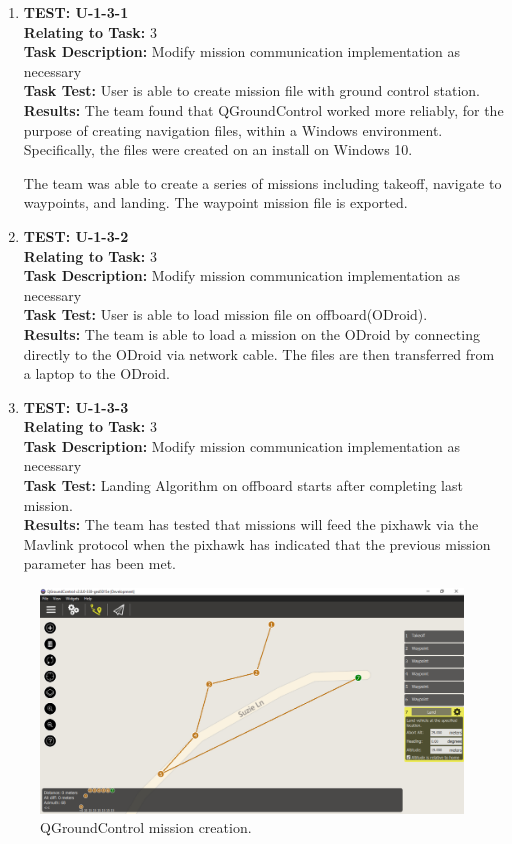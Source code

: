 \begin{enumerate}
\item \textbf{TEST: U-1-3-1}\\
\textbf{Relating to Task:} 3\\
\textbf{Task Description:} Modify mission communication implementation as necessary\\
\textbf{Task Test:} User is able to create mission file with ground control station.\\
\textbf{Results:} The team found that QGroundControl worked more reliably, for the purpose of creating navigation files, within a Windows environment. Specifically, the files were created on an install on Windows 10.\par 
The team was able to create a series of missions including takeoff, navigate to waypoints, and landing. The waypoint mission file is exported.

\item \textbf{TEST: U-1-3-2}\\
\textbf{Relating to Task:} 3\\
\textbf{Task Description:} Modify mission communication implementation as necessary\\
\textbf{Task Test:} User is able to load mission file on offboard(ODroid).\\
\textbf{Results:} The team is able to load a mission on the ODroid by connecting directly to the ODroid via network cable. The files are then transferred from a laptop to the ODroid.

\item \textbf{TEST: U-1-3-3}\\
\textbf{Relating to Task:} 3\\
\textbf{Task Description:} Modify mission communication implementation as necessary\\
\textbf{Task Test:} Landing Algorithm on offboard starts after completing last mission.\\
\textbf{Results:} The team has tested that missions will feed the pixhawk via the Mavlink protocol when the pixhawk has indicated that the previous mission parameter has been met. 
\end{enumerate}

\begin{figure}[H]
	\centering
	\includegraphics[width=\textwidth]{images/route1.PNG}
	\caption{QGroundControl mission creation.}
\end{figure}

